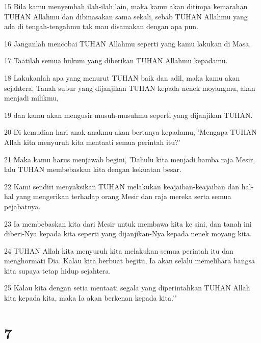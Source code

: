 \par 15 Bila kamu menyembah ilah-ilah lain, maka kamu akan ditimpa kemarahan TUHAN Allahmu dan dibinasakan sama sekali, sebab TUHAN Allahmu yang ada di tengah-tengahmu tak mau disamakan dengan apa pun.
\par 16 Janganlah mencobai TUHAN Allahmu seperti yang kamu lakukan di Masa.
\par 17 Taatilah semua hukum yang diberikan TUHAN Allahmu kepadamu.
\par 18 Lakukanlah apa yang menurut TUHAN baik dan adil, maka kamu akan sejahtera. Tanah subur yang dijanjikan TUHAN kepada nenek moyangmu, akan menjadi milikmu,
\par 19 dan kamu akan mengusir musuh-musuhmu seperti yang dijanjikan TUHAN.
\par 20 Di kemudian hari anak-anakmu akan bertanya kepadamu, 'Mengapa TUHAN Allah kita menyuruh kita mentaati semua perintah itu?'
\par 21 Maka kamu harus menjawab begini, 'Dahulu kita menjadi hamba raja Mesir, lalu TUHAN membebaskan kita dengan kekuatan besar.
\par 22 Kami sendiri menyaksikan TUHAN melakukan keajaiban-keajaiban dan hal-hal yang mengerikan terhadap orang Mesir dan raja mereka serta semua pejabatnya.
\par 23 Ia membebaskan kita dari Mesir untuk membawa kita ke sini, dan tanah ini diberi-Nya kepada kita seperti yang dijanjikan-Nya kepada nenek moyang kita.
\par 24 TUHAN Allah kita menyuruh kita melakukan semua perintah itu dan menghormati Dia. Kalau kita berbuat begitu, Ia akan selalu memelihara bangsa kita supaya tetap hidup sejahtera.
\par 25 Kalau kita dengan setia mentaati segala yang diperintahkan TUHAN Allah kita kepada kita, maka Ia akan berkenan kepada kita.'"

\chapter{7}

